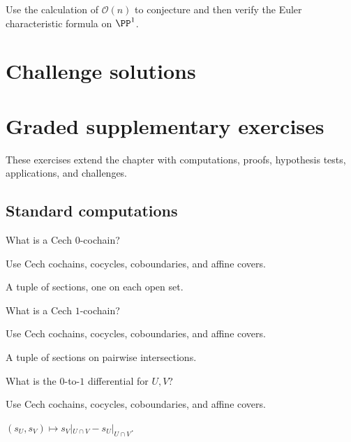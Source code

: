 \begin{problem}[Challenge]\label{chal:vi47-05}
Use the calculation of $\mathcal O(n)$ to conjecture and then verify the Euler characteristic formula on $\PP^1$.
\end{problem}

\ifdefined\IncludeChallengeSolutions
\section{Challenge solutions}

\fi

\section{Graded supplementary exercises}
These exercises extend the chapter with computations, proofs, hypothesis tests, applications, and challenges.

\subsection*{Standard computations}

\begin{exercise}\label{exr:vi47-expand-01}
What is a Cech $0$-cochain?
\end{exercise}
\begin{hint}
Use Cech cochains, cocycles, coboundaries, and affine covers.
\end{hint}
\begin{solution}
A tuple of sections, one on each open set.
\end{solution}

\begin{exercise}\label{exr:vi47-expand-02}
What is a Cech $1$-cochain?
\end{exercise}
\begin{hint}
Use Cech cochains, cocycles, coboundaries, and affine covers.
\end{hint}
\begin{solution}
A tuple of sections on pairwise intersections.
\end{solution}

\begin{exercise}\label{exr:vi47-expand-03}
What is the $0$-to-$1$ differential for $U,V$?
\end{exercise}
\begin{hint}
Use Cech cochains, cocycles, coboundaries, and affine covers.
\end{hint}
\begin{solution}
$(s_U,s_V)\mapsto s_V|_{U\cap V}-s_U|_{U\cap V}$.
\end{solution}

